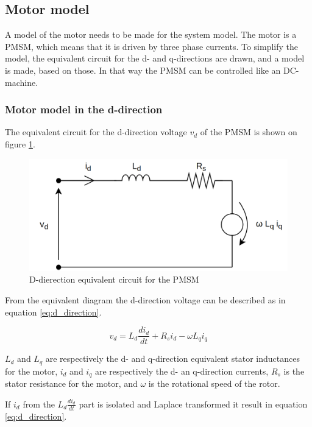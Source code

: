 \subsection{Motor model}
A model of the motor needs to be made for the system model. The motor is a PMSM,  which means that it is driven by three phase currents. To simplify the model, the equivalent circuit for the d- and q-directions are drawn, and a model is made, based on those. In that way the PMSM can be controlled like an DC-machine.

\subsubsection{Motor model in the d-direction}
The equivalent circuit for the d-direction voltage $v_d$ of the PMSM is shown on figure \ref{fig:vd}.

\begin{figure}[H]
	\centering
	\includegraphics[width=0.6\linewidth]{pictures/control/vd}
	\caption{D-dierection equivalent circuit for the PMSM}
	\label{fig:vd}
\end{figure}


From the equivalent diagram the d-direction voltage can be described as in equation \ref{eq:d_direction}.

\begin{equation}
    \label{eq:d_direction}
    v_d = L_d \frac{d i_d}{dt} + R_s i_d - \omega L_q i_q
\end{equation}

$L_d$ and $L_q$ are respectively the d- and q-direction equivalent stator inductances for the motor, $i_d$ and $i_q$ are respectively the d- an q-direction currents, $R_s$ is the stator resistance for the motor, and $\omega$ is the rotational speed of the rotor.

If $i_d$ from the $L_d \frac{di_d}{dt}$ part is isolated and Laplace transformed it result in equation \ref{eq:d_direction}.

